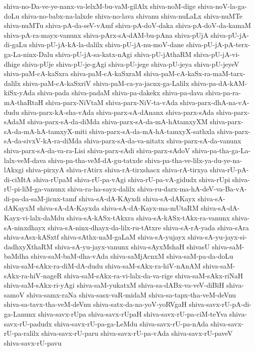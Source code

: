 {shiva-no-Da-ve-ye-nanx-va-lelxM-bu-vaM-gilAlx
shiva-noM-dige
shiva-noV-la-ga-doLu
shiva-no-babx-na-lalxde
shiva-no-lava
shivanu
shiva-nuLaLx
shiva-nuMTe
shiva-nuMTu
shiva-pA-da-seV-vAmf
shiva-pA-doV-daka
shiva-pA-doV-da-kamaM
shiva-pA-ra-mayx-vanunx
shiva-pArx-sA-dAM-bu-pAna
shiva-pUjA
shiva-pU-jA-di-gaLu
shiva-pU-jA-kA-la-dalilx
shiva-pU-jA-nu-moV-dane
shiva-pU-jA-pA-terx-ga-La-ninx-Dalu
shiva-pU-jA-sa-katx-nAgi
shiva-pU-jAthaRM
shiva-pU-jA-vi-dhige
shiva-pUje
shiva-pU-je-gAgi
shiva-pU-jege
shiva-pU-jeya
shiva-pU-jeyeV
shiva-paM-cA-kaSxra
shiva-paM-cA-kaSxraM
shiva-paM-cA-kaSx-ra-maM-tarx-dalilx
shiva-paM-cA-kaSxriV
shiva-paM-ca-ya-jacnx-ga-Lalilx
shiva-pa-dA-kAM-kiSx-yAda
shiva-pada
shiva-padaM
shiva-pa-dakekx
shiva-pa-dava
shiva-pa-ra-mA-thaRtaH
shiva-parx-NiVtaM
shiva-parx-NiV-ta-vAda
shiva-parx-dhA-na-vA-dudu
shiva-parx-kA-sha-vAda
shiva-parx-sA-dAnanx
shiva-parx-sAda
shiva-parx-sAdaM
shiva-parx-sA-da-diMda
shiva-parx-sA-da-mA-hAtamxyXM
shiva-parx-sA-da-mA-hA-tamxyX-miti
shiva-parx-sA-da-mA-hA-tamxyX-sathxla
shiva-parx-sA-da-sivxV-kA-ra-diMda
shiva-parx-sA-da-va-nitatx
shiva-parx-sA-da-vanunx
shiva-parx-sA-da-va-ra-Lisi
shiva-parx-sAdi
shiva-parx-sAdoV
shiva-pa-tha-ga-La-lalx-veM-dava
shiva-pa-tha-veM-dA-gu-tatxde
shiva-pa-tha-ve-lilx-ya-du-ye-na-lAkxgi
shiva-pirxyA
shiva-rAtirx
shiva-rA-tirxshacx
shiva-rA-tirxya
shiva-rU-pA-di-ciMtA
shiva-rUpaM
shiva-rU-pa-vAgi
shiva-rU-pa-vA-gidudx
shiva-rUpi
shiva-rU-pi-liM-ga-vanunx
shiva-ra-ha-sayx-dalilx
shiva-ru-darx-ma-hA-deV-va-Ba-vA-di-pa-da-saM-jicnx-tamf
shiva-sA-dA-KAyxdi
shiva-sA-dAKayx
shiva-sA-dAKayxM
shiva-sA-dA-Kayxda
shiva-sA-dA-Kayx-ma-mUtaRM
shiva-sA-dA-Kayx-vi-lalx-daMdu
shiva-sA-kASx-tAkxra
shiva-sA-kASx-tAkx-ra-vanunx
shiva-sA-ninxdhayx
shiva-sA-ninx-dhayx-da-lilx-ru-tAtxre
shiva-sA-rA-yada
shiva-sAra
shiva-sAsx-kASxtf
shiva-sAthx-naM-gaLaM
shiva-sA-yujayx
shiva-sA-yu-jayx-si-dadhxyXthaRM
shiva-sA-yu-jayx-vanunx
shiva-sAyxMshaH
shivasU
shiva-saM-baMdha
shiva-saM-baM-dha-vAda
shiva-saMjAcnxM
shiva-saM-pa-da-doLu
shiva-saM-sAkx-ra-diM-dA-dudu
shiva-saM-sAkx-ra-hiV-nAnAM
shiva-saM-sAkx-ra-hiV-nageR
shiva-saM-sAkx-ra-vi-lalx-da-va-rige
shiva-saM-sAkx-riNaH
shiva-saM-sAkx-ri-yAgi
shiva-saM-yukatxM
shiva-sa-dABx-va-veV-diBiH
shiva-samoV
shiva-samx-raNa
shiva-sasx-vaR-midaM
shiva-sa-tapx-tha-veM-deVnu
shiva-sa-tavx-tha-veM-deVnu
shiva-satx-da-na-yoV-yoRVgaH
shiva-savx-rU-pA-di-ga-Lanunx
shiva-savx-rUpa
shiva-savx-rUpaH
shiva-savx-rU-pa-ciM-teYva
shiva-savx-rU-padudx
shiva-savx-rU-pa-ga-LeMdu
shiva-savx-rU-pa-nAda
shiva-savx-rU-pa-ralilx
shiva-savx-rU-paru
shiva-savx-rU-pa-vAda
shiva-savx-rU-paveV
shiva-savx-rU-pavu
}
